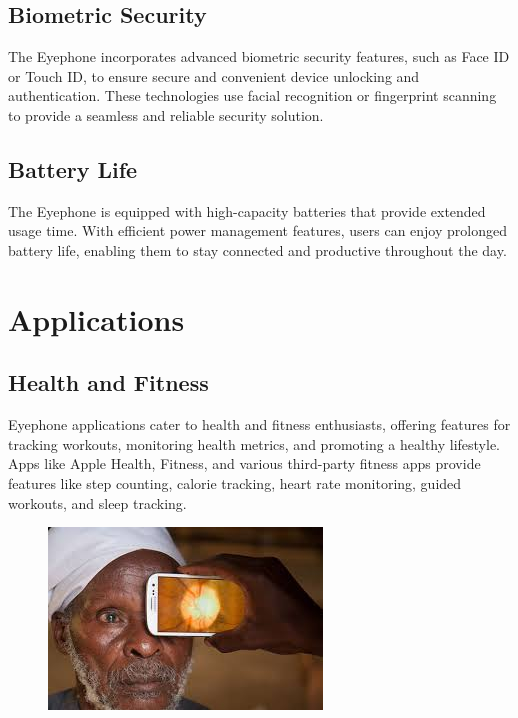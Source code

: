 \documentclass[a4paper,11pt]{report}
\begin{document}
\section{Biometric Security}
The Eyephone incorporates advanced biometric security features, such as Face ID or Touch ID, to ensure secure and convenient device unlocking and authentication. These technologies use facial recognition or fingerprint scanning to provide a seamless and reliable security solution.
\section{Battery Life}
The Eyephone is equipped with high-capacity batteries that provide extended usage time. With efficient power management features, users can enjoy prolonged battery life, enabling them to stay connected and productive throughout the day.

\chapter{Applications}

\section{Health and Fitness}
Eyephone applications cater to health and fitness enthusiasts, offering features for tracking workouts, monitoring health metrics, and promoting a healthy lifestyle. Apps like Apple Health, Fitness, and various third-party fitness apps provide features like step counting, calorie tracking, heart rate monitoring, guided workouts, and sleep tracking.

\begin{figure}[h]
	\centering
	\hspace{21pt}
	\includegraphics[width=.70\linewidth]{eyephone2.jpg}
\end{figure}
\end{document}
